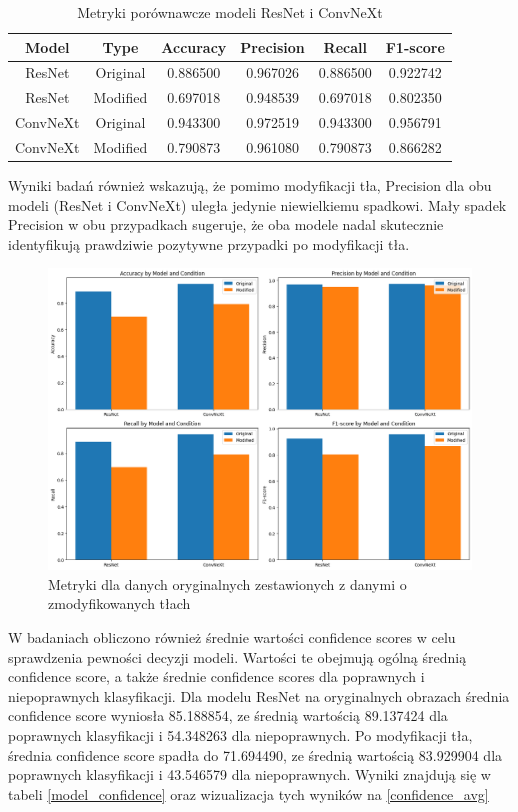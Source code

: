 \begin{table}
	\centering
	\begin{tabular}{|c|c|c|c|c|c|}
		\hline
		\textbf{Model} & \textbf{Type} & \textbf{Accuracy} & \textbf{Precision} & \textbf{Recall} & \textbf{F1-score} \\
		\hline
		ResNet & Original & 0.886500 & 0.967026 & 0.886500 & 0.922742 \\
		\hline
		ResNet & Modified & 0.697018 & 0.948539 & 0.697018 & 0.802350 \\
		\hline
		ConvNeXt & Original & 0.943300 & 0.972519 & 0.943300 & 0.956791 \\
		\hline
		ConvNeXt & Modified & 0.790873 & 0.961080 & 0.790873 & 0.866282 \\
		\hline
	\end{tabular}
	\caption{Metryki porównawcze modeli ResNet i ConvNeXt}
	\label{tab:model_comparison_metrics}
\end{table}

Wyniki badań również wskazują, że pomimo modyfikacji tła, Precision dla obu modeli (ResNet i ConvNeXt) uległa jedynie niewielkiemu spadkowi. Mały spadek Precision w obu przypadkach sugeruje, że oba modele nadal skutecznie identyfikują 
prawdziwie pozytywne przypadki po modyfikacji tła.

\begin{figure}
	\centering\includegraphics[width=.9\textwidth]{img/overall_metrics}
	\caption{Metryki dla danych oryginalnych zestawionych z danymi o zmodyfikowanych tłach}  
    \label{rys:overall_metrics}
\end{figure}


W badaniach obliczono również średnie wartości confidence scores w celu sprawdzenia pewności decyzji modeli. Wartości te obejmują ogólną średnią confidence score, a także średnie confidence scores dla poprawnych i niepoprawnych klasyfikacji. 
Dla modelu ResNet na oryginalnych obrazach średnia confidence score wyniosła 85.188854, ze średnią wartością 89.137424 dla poprawnych klasyfikacji i 54.348263 dla niepoprawnych. Po 
modyfikacji tła, średnia confidence score spadła do 71.694490, ze średnią wartością 83.929904 dla poprawnych klasyfikacji i 43.546579 dla niepoprawnych. Wyniki znajdują się w tabeli \ref*{model_confidence} oraz wizualizacja tych wyników na 
\ref*{confidence_avg}

